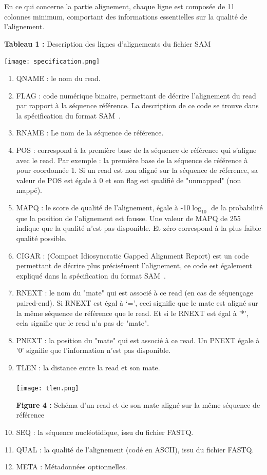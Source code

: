 \documentclass[a4paper,12pt]{article}
\begin{document}
En ce qui concerne la partie alignement, chaque ligne est composée de 11 colonnes minimum, comportant des informations essentielles sur la qualité de l'alignement.   \\
  \begin{center}
  \textbf{ Tableau 1 : }Description des lignes d'alignements du fichier SAM 
    \end{center}
      \begin{center}
  \texttt{[image: specification.png]}~
    \end{center}
\begin{enumerate}
\item QNAME :	le nom du read.
\item FLAG  :	code numérique binaire, permettant de décrire l'alignement du read par rapport à la séquence référence. La description de ce code se trouve dans la spécification du format SAM~\cite{SAM}.
\item RNAME :	Le nom de la séquence de référence.
\item POS	: correspond à la première base de la séquence de référence qui s'aligne avec le read. Par exemple : la première base de la séquence de référence à pour coordonnée 1. Si un read est non aligné sur la séquence de réference, sa valeur de POS est égale à 0 et son flag est qualifié de "unmapped" (non mappé). 
\item MAPQ  :	le score de qualité de l'alignement, égale à -10$\log_{10}$ de la probabilité que la position de l'alignement est fausse. Une valeur de MAPQ de 255 indique que la qualité n'est pas disponible. Et zéro correspond à la plus faible qualité possible. 
\item CIGAR :   (Compact Idiosyncratic Gapped Alignment Report) est un code permettant de décrire plus précisément l'alignement, ce code est également expliqué dans la spécification du format SAM~\cite{SAM}.
\item RNEXT	: le nom du "mate" qui est associé à ce read (en cas de séquençage paired-end). Si RNEXT est égal à ‘=’, ceci signifie que le mate est aligné sur la même séquence de référence que le read. Et si le RNEXT est égal à '*', cela signifie que le read n'a pas de "mate". 
\item PNEXT	: la position du "mate" qui est associé à ce read. Un PNEXT égale à '0' signifie que l'information n'est pas disponible. 
\item TLEN : la distance entre la read et son mate. \\\\
\texttt{[image: tlen.png]}~
  \begin{center}\textbf{ Figure 4 : }Schéma d'un read et de son mate aligné sur la même séquence de référence     \end{center} 
\item SEQ	: la séquence nucléotidique, issu du fichier FASTQ.
\item QUAL : la qualité de l'alignement (codé en ASCII), issu du fichier FASTQ.
\item META : Métadonnées optionnelles. 
\end{enumerate}
\end{document}
